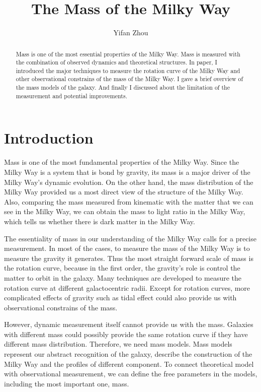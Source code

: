 \documentclass[preprint]{aastex}
\begin{document}

\title{The Mass of the Milky Way}
\author{Yifan Zhou}

\begin{abstract}
Mass is one of the most essential properties of the Milky Way. Mass is
measured with the combination of observed dynamics and theoretical
structures. In paper, I introduced the major techniques to measure the
rotation curve of the Milky Way and other observational constrains of
the mass of the Milky Way. I gave a brief overview of the mass models
of the galaxy. And finally I discussed about the limitation of the
measurement and potential improvements.  
\end{abstract}

\section{Introduction}

Mass is one of the most fundamental properties of the Milky Way. Since
the Milky Way is a system that is bond by gravity, its mass is a major
driver of the Milky Way's dynamic evolution. On the other hand, the
mass distribution of the Milky Way provided us a most direct view of
the structure of the Milky Way. Also, comparing the mass measured from
kinematic with the matter that we can see in the Milky Way, we can
obtain the mass to light ratio in the Milky Way, which tells us
whether there is dark matter in the Milky Way.

The essentiality of mass in our understanding of the Milky Way calls
for a precise measurement. In most of the cases, to measure the mass
of the Milky Way is to measure the gravity it generates. Thus the most
straight forward scale of mass is the rotation curve, because in the
first order, the gravity's role is control the matter to orbit in the
galaxy. Many techniques are developed to measure the rotation curve at
different galactocentric radii. Except for rotation curves, more
complicated effects of gravity such as tidal effect could also provide
us with observational constrains of the mass.

However, dynamic measurement itself cannot provide us with the
mass. Galaxies with different mass could possibly provide the same
rotation curve if they have different mass distribution. Therefore, we
need mass models. Mass models represent our abstract recognition of
the galaxy, describe the construction of the Milky Way and the
profiles of different component. To connect theoretical model with
observational measurement, we can define the free parameters in the
models, including the most important one, mass.
\end{document}
